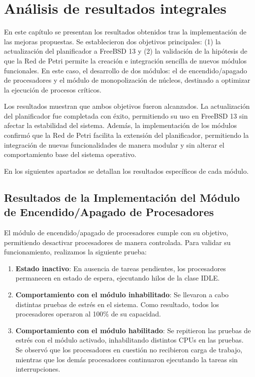 \section{Análisis de resultados integrales}
\label{ch:results}

En este capítulo se presentan los resultados obtenidos tras la implementación de las mejoras propuestas. Se establecieron dos objetivos principales: (1) la actualización del planificador a FreeBSD 13 y (2) la validación de la hipótesis de que la Red de Petri permite la creación e integración sencilla de nuevos módulos funcionales. En este caso, el desarrollo de dos módulos: el de encendido/apagado de procesadores y el módulo de monopolización de núcleos, destinado a optimizar la ejecución de procesos críticos.

Los resultados muestran que ambos objetivos fueron alcanzados. La actualización del planificador fue completada con éxito, permitiendo su uso en FreeBSD 13 sin afectar la estabilidad del sistema. Además, la implementación de los módulos confirmó que la Red de Petri facilita la extensión del planificador, permitiendo la integración de nuevas funcionalidades de manera modular y sin alterar el comportamiento base del sistema operativo.

En los siguientes apartados se detallan los resultados específicos de cada módulo.

\subsection{Resultados de la Implementación del Módulo de Encendido/Apagado de Procesadores}

El módulo de encendido/apagado de procesadores cumple con su objetivo, permitiendo desactivar procesadores de manera controlada. Para validar su funcionamiento, realizamos la siguiente prueba:

\begin{enumerate}
    \item \textbf{Estado inactivo}: En ausencia de tareas pendientes, los procesadores permanecen en estado de espera, ejecutando hilos de la clase IDLE.\@
    \item \textbf{Comportamiento con el módulo inhabilitado}: Se llevaron a cabo distintas pruebas de estrés en el sistema. Como resultado, todos los procesadores operaron al 100\% de su capacidad.
    \item \textbf{Comportamiento con el módulo habilitado}: Se repitieron las pruebas de estrés con el módulo activado, inhabilitando distintos CPUs en las pruebas. Se observó que los procesadores en cuestión no recibieron carga de trabajo, mientras que los demás procesadores continuaron ejecutando la tareas sin interrupciones.
\end{enumerate}

